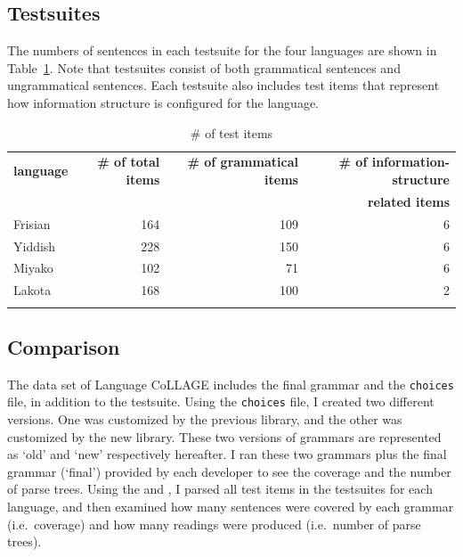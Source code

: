 \subsection{Testsuites}
\label{12:ssec:lc-testsuites}


The numbers of sentences in each testsuite for the four languages are
shown in Table~\ref{tbl:lc:testsites}. Note that testsuites consist of
both grammatical sentences and ungrammatical sentences.  Each
testsuite also includes test items that represent how information
structure is configured for the language.


\begin{table}[!t]
\small
\centering
\caption{\# of test items}
\label{tbl:lc:testsites}
\begin{tabular}{lrrr}
\lsptoprule
\textbf{language} & \textbf{\# of total items} & \textbf{\# of grammatical items}  & \textbf{\# of information-structure}\\
& & & \textbf{related items} \\ \hline
\midrule
Frisian & 164 & 109  & 6\\
Yiddish  & 228 & 150 & 6\\
Miyako & 102 & 71 & 6\\
Lakota & 168 & 100 & 2 \\
\lspbottomrule 
\end{tabular}
\end{table}




\subsection{Comparison}
\label{12:ssec:lc-comp}


The data set of Language CoLLAGE includes the final grammar and the
\texttt{choices} file, in addition to the testsuite. Using the
\texttt{choices} file, I created two different versions. One was
customized by the previous library, and the other was customized by
the new library. These two versions of grammars are represented as
`old' and `new' respectively hereafter.  I ran these two grammars plus
the final grammar (`final') provided by each developer to see the
coverage and the number of parse trees.  Using the \isi{\lkb} and
\isi{\itsdb}, I parsed all test items in the testsuites for each
language, and then examined how many sentences were covered by each
grammar (i.e.\ coverage) and how many readings were produced
(i.e.\ number of parse trees).



